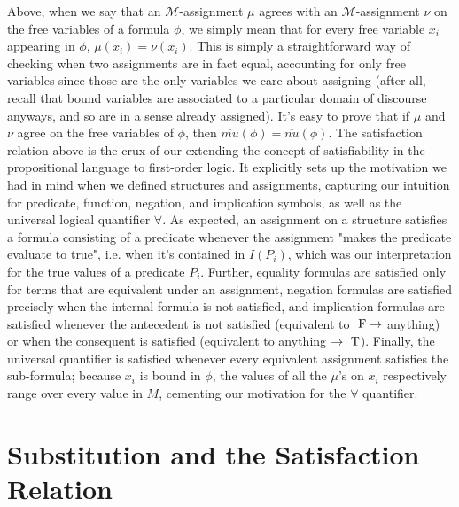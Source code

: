\documentclass{article}
\begin{document}
Above, when we say that an $ \mathcal{M} $-assignment $ \mu $ agrees with an $ \mathcal{M} $-assignment $ \nu $ on the free variables of a formula $ \phi $, we simply mean that for every free variable $ x_i $ appearing in $ \phi $, $ \mu(x_i) = \nu(x_i) $. This is simply a straightforward way of checking when two assignments are in fact equal, accounting for only free variables since those are the only variables we care about assigning (after all, recall that bound variables are associated to a particular domain of discourse anyways, and so are in a sense already assigned). It's easy to prove that if $ \mu $ and $ \nu $ agree on the free variables of $ \phi $, then $ \overline{mu}(\phi) = \overline{nu}(\phi) $.
\nn
The satisfaction relation above is the crux of our extending the concept of satisfiability in the propositional language to first-order logic. It explicitly sets up the motivation we had in mind when we defined structures and assignments, capturing our intuition for predicate, function, negation, and implication symbols, as well as the universal logical quantifier $ \forall $. As expected, an assignment on a structure satisfies a formula consisting of a predicate whenever the assignment "makes the predicate evaluate to true", i.e. when it's contained in $ I(P_i) $, which was our interpretation for the true values of a predicate $ P_i $. Further, equality formulas are satisfied only for terms that are equivalent under an assignment, negation formulas are satisfied precisely when the internal formula is not satisfied, and implication formulas are satisfied whenever the antecedent is not satisfied (equivalent to $ \text{\normalfont\ F} \rightarrow $ anything) or when the consequent is satisfied (equivalent to anything $ \rightarrow \text{\normalfont\ T} $). Finally, the universal quantifier is satisfied whenever every equivalent assignment satisfies the sub-formula; because $ x_i $ is bound in $ \phi $, the values of all the $ \mu $'s on $ x_i $ respectively range over every value in $ M $, cementing our motivation for the $ \forall $ quantifier.
\nn


\section{Substitution and the Satisfaction Relation}
\end{document}
